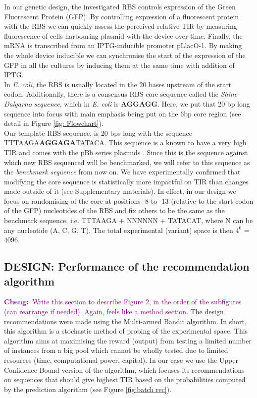 \documentclass{article}
\newcommand{\cheng}[1]{\textcolor{purple}{{\bf Cheng:~}#1}}
\begin{document}
In our genetic design, the investigated RBS controls expression of the Green Fluorescent Protein (GFP). 
By controlling expression of a fluorescent protein with the RBS we can quickly assess the perceived relative TIR by measuring fluorescence of cells harbouring plasmid with the device over time.
Finally, the mRNA is transcribed from an IPTG-inducible promoter pLlacO-1. 
By making the whole device inducible we can synchronise the start of the expression of the GFP in all the cultures by inducing them at the same time with addition of IPTG.\\

In \emph{E. coli}, the RBS is usually located in the 20 bases upstream of the start codon. 
Additionally, there is a consensus RBS core sequence called the \textit{Shine-Dalgarno sequence}, which in \emph{E. coli} is \textbf{AGGAGG}. 
Here, we put that 20 bp long sequence into focus with main emphasis being put on the 6bp core region
(see detail in Figure \ref{fig: Flowchart}).\\

Our template RBS sequence, is 20 bps long with the sequence TTTAAGA\textbf{AGGAGA}TATACA.
This sequence is a known to have a very high TIR and comes with the pBb series plasmids \cite{Lee2011}. 
Since this is the sequence against which new RBS sequenced will be benchmarked,
we will refer to this sequence as the \textit{benchmark sequence} from now on.
We have experimentally confirmed that modifying the core sequence is statistically more impactful on TIR than changes made outside of it (see Supplementary materials).
In effect, in our design we focus on randomising of the core at positions -8 to -13 (relative to the start codon of the GFP) nucleotides of the RBS and fix others to be the same as the benchmark sequence, i.e. TTTAAGA + NNNNNN + TATACAT, where N can be any nucleotide (A, C, G, T). 
The total experimental (variant) space is then $4^6$ = 4096.

\subsection{DESIGN: Performance of the recommendation algorithm}
\label{sec:ucb-results}

\cheng{Write this section to describe Figure 2, in the order of the subfigures (can rearrange if needed). Again, feels like a method section.}
The design recommendations were made using the Multi-armed Bandit algorithm.
In short, this algorithm is a stochastic method of probing of the experimental space. 
This algorithm aims at maximising the reward (output) from testing a limited number of instances from a big pool which cannot be wholly tested due to limited resources (time, computational power, capital). 
In our case we use the Upper Confidence Bound version of the algorithm, which focuses its recommendations on sequences that should give highest TIR based on the probabilities computed by the prediction algorithm (see Figure \ref{fig:batch rec}).\\ 
\end{document}

